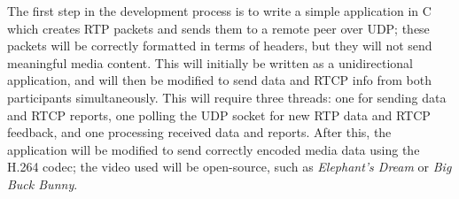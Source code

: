 \documentclass{mprop}
\begin{document}
The first step in the development process is to write a simple application in C which creates RTP packets and sends them to a remote peer over UDP; these packets will be correctly formatted in terms of headers, but they will not send meaningful media content. This will initially be written as a unidirectional application, and will then be modified to send data and RTCP info from both participants simultaneously. This will require three threads: one for sending data and RTCP reports, one polling the UDP socket for new RTP data and RTCP feedback, and one processing received data and reports. After this, the application will be modified to send correctly encoded media data using the H.264 codec; the video used will be open-source, such as \textit{Elephant's Dream} or \textit{Big Buck Bunny}.
\end{document}
